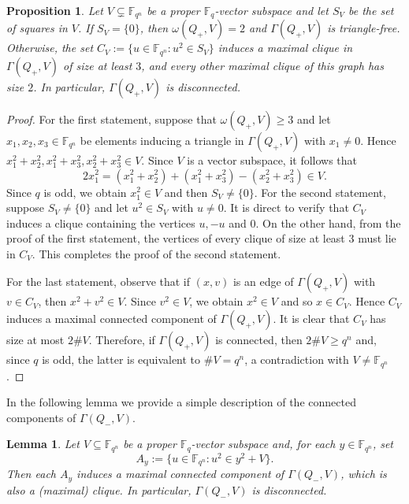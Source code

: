 \documentclass[11pt]{amsart}
\newcommand{\G}{\Gamma}
\newcommand{\F}{\mathbb F}
\newtheorem{lemma}[theorem]{Lemma}
\newtheorem{proposition}[theorem]{Proposition}
\theoremstyle{definition}
\theoremstyle{remark}
\newtheorem{remark}[theorem]{Remark}
\begin{document}
\begin{proposition}\label{prop:Q+}
    Let $V\subsetneq \F_{q^n}$ be a proper $\F_q$-vector subspace and let $S_V$ be the set of squares in $V$. If $S_V=\{0\}$, then $\omega(Q_+, V)=2$ and $\G(Q_+, V)$ is triangle-free. Otherwise, the set $C_V:=\{u\in \F_{q^n}: u^2\in S_V\}$ induces a maximal clique in $\Gamma(Q_+, V)$ of size at least $3$, and every other maximal clique of this graph has size $2$. In particular, $\Gamma(Q_+, V)$ is disconnected.
\end{proposition}
\begin{proof}
For the first statement, suppose that $\omega(Q_+, V)\ge 3$ and let $x_1, x_2, x_3\in \F_{q^n}$ be elements inducing a triangle in $\G(Q_+, V)$ with $x_1\ne 0$. Hence $x_1^2+x_2^2, x_1^2+x_3^2, x_2^2+x_3^2\in V$. Since $V$ is a vector subspace, it follows that
$$2x_1^2=(x_1^2+x_2^2)+(x_1^2+x_3^2)-(x_2^2+x_3^2)\in V.$$
Since $q$ is odd, we obtain $x_1^2\in V$ and then $S_V\ne \{0\}$.
For the second statement, suppose $S_V\ne \{0\}$ and let $u^2\in S_V$ with $u\ne 0$. It is direct to verify that $C_V$ induces a clique containing the vertices $u, -u$ and $0$. On the other hand, from the proof of the first statement, the vertices of every clique of size at least $3$ must lie in $C_V$. This completes the proof of the second statement. 

For the last statement, observe that if $(x, v)$ is an edge of $\G(Q_+, V)$
 with $v\in C_V$, then $x^2+v^2\in V$. Since $v^2\in V$, we obtain $x^2\in V$ and so $x\in C_V$. Hence $C_V$ induces a maximal connected component of $\G(Q_+, V)$. It is clear that $C_V$ has size at most $2\# V$. Therefore, if $\G(Q_+, V)$ is connected, then $2\# V\ge q^n$ and, since $q$ is odd, the latter is equivalent to $\# V=q^n$, a contradiction with $V\ne \F_{q^n}$.
\end{proof}

In the following lemma we provide a simple description of the connected components of $\Gamma(Q_-, V)$.


\begin{lemma}\label{lem:Q-}
Let $V\subseteq \F_{q^n}$ be a proper $\F_q$-vector subspace  and, for each $y\in \F_{q^n}$, set 
$$A_y:=\{u\in \F_{q^n}: u^2\in y^2+V\}.$$ 
Then each $A_y$ induces a maximal connected component of $\Gamma(Q_-, V)$, which is also a (maximal) clique. In particular, $\Gamma(Q_-, V)$ is disconnected.
\end{lemma}
\end{document}
